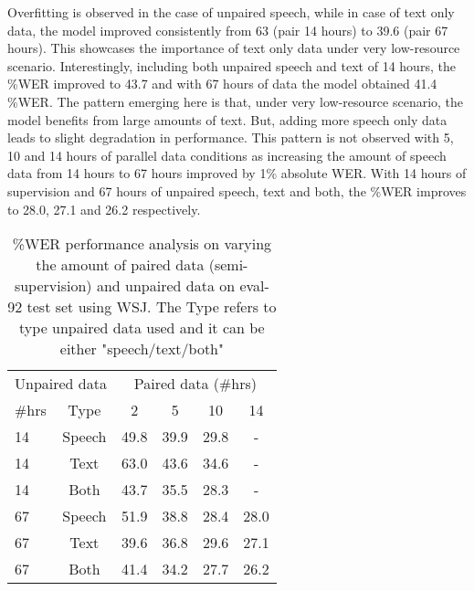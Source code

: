 \documentclass[a4paper]{article}
\begin{document}
Overfitting is observed in the case of unpaired speech, while in case of text only data, the model improved consistently from 63 (pair 14 hours) to 39.6 (pair 67 hours). This showcases the importance of text only data under very low-resource scenario. Interestingly,  including both unpaired speech and text of 14 hours, the \%WER improved to 43.7 and with 67 hours of data the model obtained 41.4 \%WER. The pattern emerging here is that, under very low-resource scenario, the model benefits from large amounts of text. But, adding more speech only data leads to slight degradation in performance. This pattern is not observed with 5, 10 and 14 hours of parallel data conditions as increasing the amount of speech data from 14 hours to 67 hours improved by 1\% absolute WER. With 14 hours of supervision and 67 hours of unpaired speech, text and both, the \%WER improves to 28.0, 27.1 and 26.2 respectively.
\begin{table}[H]
\caption{\%WER performance analysis on varying the amount of paired data (semi-supervision) and unpaired data on eval-92 test set using WSJ. The Type refers to type unpaired data used and it can be either "speech/text/both"}\label{tab:wsj}
\centering{}\begin{tabular}{lccccc}
\hline 
\multicolumn{2}{c}{\footnotesize{}Unpaired data} & \multicolumn{4}{c}{\footnotesize{}Paired data (\#hrs)}\tabularnewline
\cline{3-6} 
{\footnotesize{}\#hrs} & {\footnotesize{}Type} & {\footnotesize{}2} & {\footnotesize{}5} & {\footnotesize{}10} & {\footnotesize{}14}\tabularnewline
\hline 
\hline 
{\footnotesize{}14}  & {\footnotesize{}Speech} & {\footnotesize{}49.8} & {\footnotesize{}39.9} & {\footnotesize{}29.8} & {\footnotesize{}-}\tabularnewline

{\footnotesize{}14}  & {\footnotesize{}Text} & {\footnotesize{}63.0} & {\footnotesize{}43.6} & {\footnotesize{}34.6} & {\footnotesize{}-}\tabularnewline

{\footnotesize{}14}  & {\footnotesize{}Both} & {\footnotesize{}43.7} & {\footnotesize{}35.5} & {\footnotesize{}28.3} & -\tabularnewline

{\footnotesize{}67}  & {\footnotesize{}Speech} & {\footnotesize{}51.9} & {\footnotesize{}38.8} & {\footnotesize{}28.4} & {\footnotesize{}28.0}\tabularnewline

{\footnotesize{}67}  & {\footnotesize{}Text} & {\footnotesize{}39.6} & {\footnotesize{}36.8} & {\footnotesize{}29.6} & {\footnotesize{}27.1}\tabularnewline

{\footnotesize{}67}  & {\footnotesize{}Both} & {\footnotesize{}41.4} & {\footnotesize{}34.2} & {\footnotesize{}27.7} & {\footnotesize{}26.2}\tabularnewline
\hline 
\end{tabular}
\end{table}
\end{document}
